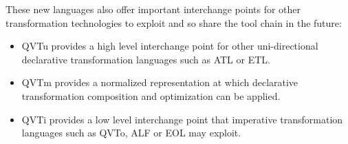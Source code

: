 
These new languages also offer important interchange points for other transformation technologies to exploit and so share the tool chain in the future:

\begin{itemize}
\item QVTu provides a high level interchange point for other uni-directional declarative transformation languages such as ATL\cite{Jouault.etal2008} or ETL\cite{Paige.etal2009}.
\item QVTm provides a normalized representation at which declarative transformation composition and optimization can be applied.
\item QVTi provides a low level interchange point that imperative transformation languages such as QVTo, ALF\cite{Perseil2011} or EOL\cite{Paige.etal2009} may exploit.
\end{itemize}







